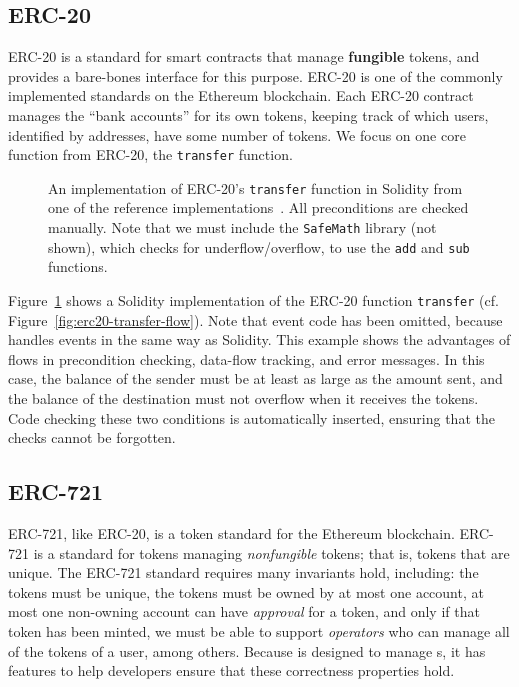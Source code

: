 \documentclass[dvipsnames, usenames, sigconf]{acmart}
\begin{document}
\subsection{ERC-20}\label{sec:erc20-impl}
ERC-20 is a standard for smart contracts that manage \textbf{fungible} tokens, and provides a bare-bones interface for this purpose.
ERC-20 is one of the commonly implemented standards on the Ethereum blockchain.
Each ERC-20 contract manages the ``bank accounts'' for its own tokens, keeping track of which users, identified by addresses, have some number of tokens.
We focus on one core function from ERC-20, the \lstinline{transfer} function.
\begin{figure}[ht]
    \centering
    
    \caption{An implementation of ERC-20's \lstinline{transfer} function in Solidity from one of the reference implementations~\cite{erc20Consensys}.
        All preconditions are checked manually.
        Note that we must include the \lstinline{SafeMath} library (not shown), which checks for underflow/overflow, to use the \lstinline{add} and \lstinline{sub} functions.}
    \label{fig:erc20-transfer-sol}
\end{figure}
Figure~\ref{fig:erc20-transfer-sol} shows a Solidity implementation of the ERC-20 function \lstinline{transfer} (cf. Figure~\ref{fig:erc20-transfer-flow}).
Note that event code has been omitted, because \langName handles events in the same way as Solidity.
This example shows the advantages of flows in precondition checking, data-flow tracking, and error messages.
In this case, the balance of the sender must be at least as large as the amount sent, and the balance of the destination must not overflow when it receives the tokens.
Code checking these two conditions is automatically inserted, ensuring that the checks cannot be forgotten.

\subsection{ERC-721}\label{sec:erc721-impl}

ERC-721, like ERC-20, is a token standard for the Ethereum blockchain.
ERC-721 is a standard for tokens managing \emph{nonfungible} tokens; that is, tokens that are unique.
The ERC-721 standard requires many invariants hold, including:
    the tokens must be unique,
    the tokens must be owned by at most one account,
    at most one non-owning account can have \emph{approval} for a token, and only if that token has been minted,
    we must be able to support \emph{operators} who can manage all of the tokens of a user,
    among others.
Because \langName is designed to manage \assetTxt{}s, it has features to help developers ensure that these correctness properties hold.
\end{document}
